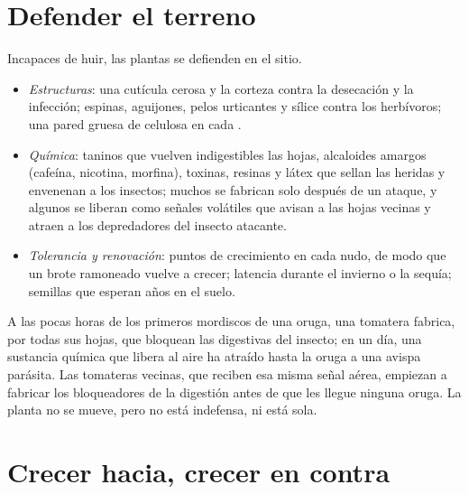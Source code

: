 \section{Defender el terreno}

\begin{proposition}\label{prop:g12:plant-rooted-life:defences}
Incapaces de huir, las plantas se defienden en el sitio.
\begin{itemize}
  \item \emph{Estructuras}: una cutícula cerosa y la corteza contra la
        desecación y la infección; espinas, aguijones, pelos urticantes
        y sílice contra los herbívoros; una pared gruesa de celulosa en
        cada .
  \item \emph{Química}: taninos que vuelven indigestibles las hojas,
        alcaloides amargos (cafeína, nicotina, morfina), toxinas,
        resinas y látex que sellan las heridas y envenenan a los
        insectos; muchos se fabrican solo después de un ataque, y
        algunos se liberan como señales volátiles que avisan a las
        hojas vecinas y atraen a los depredadores del insecto atacante.
  \item \emph{Tolerancia y renovación}: puntos de crecimiento en cada
        nudo, de modo que un brote ramoneado vuelve a crecer; latencia
        durante el invierno o la sequía; semillas que esperan años en
        el suelo.
\end{itemize}
\end{proposition}
\admitted

\begin{example}\label{ex:g12:plant-rooted-life:caterpillar}
A las pocas horas de los primeros mordiscos de una oruga, una tomatera
fabrica, por todas sus hojas,  que bloquean las 
digestivas del insecto; en un día, una sustancia química que libera al
aire ha atraído hasta la oruga a una avispa parásita. Las tomateras
vecinas, que reciben esa misma señal aérea, empiezan a fabricar los
bloqueadores de la digestión antes de que les llegue ninguna oruga. La
planta no se mueve, pero no está indefensa, ni está sola.
\end{example}

\section{Crecer hacia, crecer en contra}

